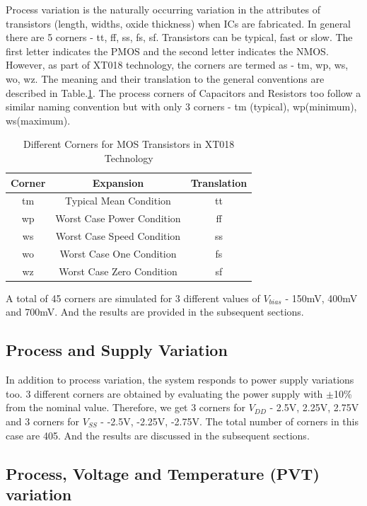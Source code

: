 Process variation is the naturally occurring variation in the attributes of transistors (length, widths, oxide thickness) when ICs are fabricated. In general there are 5 corners - tt, ff, ss, fs, sf. Transistors can be typical, fast or slow. The first letter indicates the PMOS and the second letter indicates the NMOS. However, as part of XT018 technology, the corners are termed as - tm, wp, ws, wo, wz. The meaning and their translation to the general conventions are described in Table.\ref{tab:Process_Corners}. The process corners of Capacitors and Resistors too follow a similar naming convention but with only 3 corners - tm (typical), wp(minimum), ws(maximum).

\begin{table} [H]
\centering
\begin{tabular}{@{}ccc@{}}
\toprule
Corner	& Expansion						& Translation	\\ \midrule
tm		& Typical Mean Condition 		& tt			\\
wp		& Worst Case Power Condition	& ff			\\
ws		& Worst Case Speed Condition 	& ss			\\
wo		& Worst Case One Condition 		& fs			\\
wz		& Worst Case Zero Condition 	& sf			\\
\bottomrule
\end{tabular}
\caption{Different Corners for MOS Transistors in XT018 Technology}
\label{tab:Process_Corners}
\end{table}

A total of 45 corners are simulated for 3 different values of $V_{bias}$ - 150mV, 400mV and 700mV. And the results are provided in the subsequent sections.

\subsection{Process and Supply Variation}

In addition to process variation, the system responds to power supply variations too. 3 different corners are obtained by evaluating the power supply with $\pm$10\% from the nominal value. Therefore, we get 3 corners for $V_{DD}$ - 2.5V, 2.25V, 2.75V and 3 corners for $V_{SS}$ - -2.5V, -2.25V, -2.75V. The total number of corners in this case are 405. And the results are discussed in the subsequent sections.
 
\subsection{Process, Voltage and Temperature (PVT) variation}

